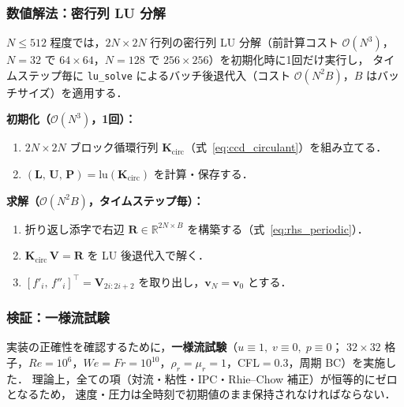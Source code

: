 \subsubsection{数値解法：密行列 LU 分解}

$N \leq 512$ 程度では，$2N\times 2N$ 行列の密行列 LU 分解（前計算コスト $\mathcal{O}(N^3)$，
$N=32$ で $64\times64$，$N=128$ で $256\times256$）を初期化時に1回だけ実行し，
タイムステップ毎に \texttt{lu\_solve} によるバッチ後退代入（コスト $\mathcal{O}(N^2 B)$，$B$ はバッチサイズ）を適用する．

\begin{tcolorbox}[algbox, title={周期 CCD 解法の手順（実装概要）}]
\textbf{初期化（$\mathcal{O}(N^3)$，1回）：}
\begin{enumerate}
  \item $2N\times 2N$ ブロック循環行列 $\mathbf{K}_{\mathrm{circ}}$（式~\eqref{eq:ccd_circulant}）を組み立てる．
  \item $(\mathbf{L},\,\mathbf{U},\,\mathbf{P}) = \mathrm{lu}(\mathbf{K}_{\mathrm{circ}})$ を計算・保存する．
\end{enumerate}
\textbf{求解（$\mathcal{O}(N^2 B)$，タイムステップ毎）：}
\begin{enumerate}
  \item 折り返し添字で右辺 $\mathbf{R} \in \mathbb{R}^{2N\times B}$ を構築する（式~\eqref{eq:rhs_periodic}）．
  \item $\mathbf{K}_{\mathrm{circ}}\,\mathbf{V} = \mathbf{R}$ を LU 後退代入で解く．
  \item $[f'_i,\, f''_i]^\top = \mathbf{V}_{2i:2i+2}$ を取り出し，$\bm{v}_N = \bm{v}_0$ とする．
\end{enumerate}
\end{tcolorbox}

\subsubsection{検証：一様流試験}
\label{sec:verify_uniform_flow}

実装の正確性を確認するために，\textbf{一様流試験}（$u\equiv1,\; v\equiv0,\; p\equiv0$；
$32\times32$ 格子，$Re=10^6$，$We=Fr=10^{10}$，$\rho_r=\mu_r=1$，CFL$=0.3$，周期 BC）を実施した．
理論上，全ての項（対流・粘性・IPC・Rhie--Chow 補正）が恒等的にゼロとなるため，
速度・圧力は全時刻で初期値のまま保持されなければならない．

